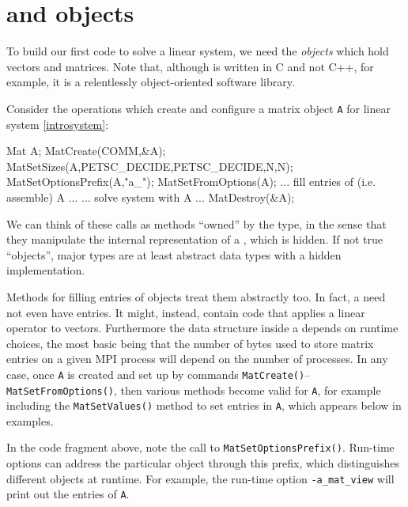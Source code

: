 \section{\PETSc \pVec and \pMat objects}

To build our first \PETSc code to solve a linear system, we need the \emph{objects} which hold vectors and matrices.  Note that, although \PETSc is written in C and not C++, for example, it is a relentlessly object-oriented software library.

Consider the operations which create and configure a matrix object \texttt{A} for linear system \eqref{introsystem}:
\begin{code}
Mat A;
MatCreate(COMM,&A);
MatSetSizes(A,PETSC_DECIDE,PETSC_DECIDE,N,N);
MatSetOptionsPrefix(A,"a_");
MatSetFromOptions(A);
... fill entries of (i.e. assemble) A ...
... solve system with A ...
MatDestroy(&A);
\end{code}
We can think of these calls as methods ``owned'' by the \pMat type, in the sense that they manipulate the internal representation of a \pMat, which is hidden.  If not true ``objects'', major \PETSc types are at least abstract data types with a hidden implementation.

Methods for filling entries of \pMat objects treat them abstractly too.  In fact, a \pMat need not even have entries.  It might, instead, contain code that applies a linear operator to vectors.  Furthermore the data structure inside a \pMat depends on runtime choices, the most basic being that the number of bytes used to store matrix entries on a given MPI process will depend on the number of processes.  In any case, once \pMat \texttt{A} is created and set up by commands \texttt{MatCreate()}--\texttt{MatSetFromOptions()}, then various methods become valid for \texttt{A}, for example including the \texttt{MatSetValues()} method to set entries in \texttt{A}, which appears below in examples.

In the code fragment above, note the call to \texttt{MatSetOptionsPrefix()}.  Run-time options can address the particular \pMat object through this prefix, which distinguishes different \pMat objects at runtime.  For example, the run-time option \texttt{-a\_mat\_view} will print out the entries of \texttt{A}.
 
